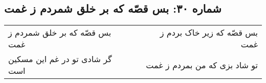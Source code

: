 \begin{center}
\section*{شماره ۳۰: بس قصّه که بر خلق شمردم ز غمت}
\label{sec:030}
\begin{longtable}{l p{0.5cm} r}
بس قصّه که بر خلق شمردم ز غمت
&&
بس قصّه که زیر خاک بردم ز غمت
\\
گر شادی تو در غم این مسکین است
&&
تو شاد بزی که من بمردم ز غمت
\\
\end{longtable}
\end{center}
